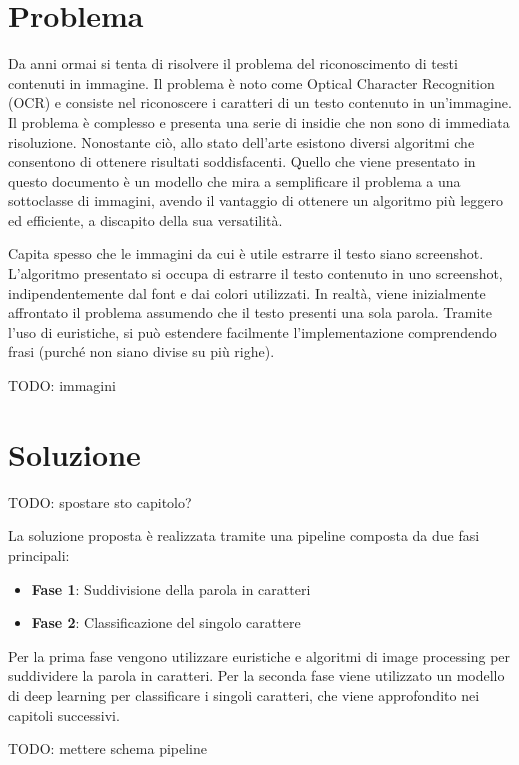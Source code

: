 \chapter{Problema}

Da anni ormai si tenta di risolvere il problema del riconoscimento di testi contenuti in immagine. Il problema è noto come Optical Character Recognition (OCR) e consiste nel riconoscere i caratteri di un testo contenuto in un'immagine. Il problema è complesso e presenta una serie di insidie che non sono di immediata risoluzione. Nonostante ciò, allo stato dell'arte esistono diversi algoritmi che consentono di ottenere risultati soddisfacenti.
Quello che viene presentato in questo documento è un modello che mira a semplificare il problema a una sottoclasse di immagini, avendo il vantaggio di ottenere un algoritmo più leggero ed efficiente, a discapito della sua versatilità.

Capita spesso che le immagini da cui è utile estrarre il testo siano screenshot. L'algoritmo presentato si occupa di estrarre il testo contenuto in uno screenshot, indipendentemente dal font e dai colori utilizzati. In realtà, viene inizialmente affrontato il problema assumendo che il testo presenti una sola parola. Tramite l'uso di euristiche, si può estendere facilmente l'implementazione comprendendo frasi (purché non siano divise su più righe).

TODO: immagini

\chapter{Soluzione}

TODO: spostare sto capitolo?

La soluzione proposta è realizzata tramite una pipeline composta da due fasi principali:
\begin{itemize}
	\item \textbf{Fase 1}: Suddivisione della parola in caratteri
	\item \textbf{Fase 2}: Classificazione del singolo carattere
\end{itemize}

Per la prima fase vengono utilizzare euristiche e algoritmi di image processing per suddividere la parola in caratteri. Per la seconda fase viene utilizzato un modello di deep learning per classificare i singoli caratteri, che viene approfondito nei capitoli successivi.

TODO: mettere schema pipeline

